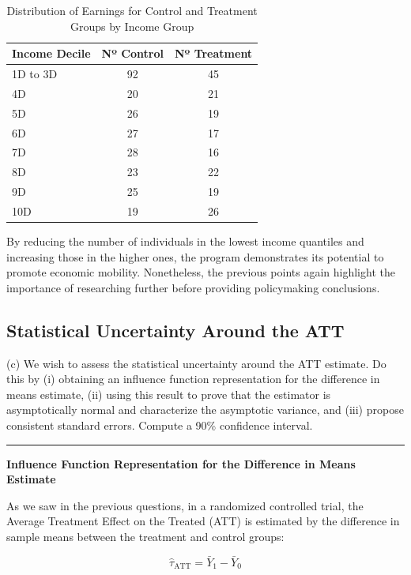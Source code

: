 \documentclass{article}
\newenvironment{colorparagraph}[1]{\par\color{#1}}{\par}
\begin{document}
\begin{table}[H]
\centering
\begin{tabular}{|l|c|c|}
\hline
\textbf{Income Decile} & \textbf{Nº Control} & \textbf{Nº Treatment} \\
\hline
1D to 3D & 92 & 45 \\
4D       & 20 & 21 \\
5D       & 26 & 19 \\
6D       & 27 & 17 \\
7D       & 28 & 16 \\
8D       & 23 & 22 \\
9D       & 25 & 19 \\
10D      & 19 & 26 \\
\hline
\end{tabular}
\caption{Distribution of Earnings for Control and Treatment Groups by Income Group}
\label{tab:earnings_distribution}
\end{table}

By reducing the number of individuals in the lowest income quantiles and increasing those in the higher ones, the program demonstrates its potential to promote economic mobility. Nonetheless, the previous points again highlight the importance of researching further before providing policymaking conclusions.

\begin{colorparagraph}{questioncolor}
\label{q4c}\subsection{Statistical Uncertainty Around the ATT}
(c) We wish to assess the statistical uncertainty around the ATT estimate. Do this by (i) obtaining an influence function representation for the difference in means estimate, (ii) using this result to prove that the estimator is asymptotically normal and characterize the asymptotic variance, and (iii) propose consistent standard errors. Compute a 90\% confidence interval.

\rule{\textwidth}{0.5pt}
\end{colorparagraph}

\textbf{Influence Function Representation for the Difference in Means Estimate}

As we saw in the previous questions, in a randomized controlled trial, the Average Treatment Effect on the Treated (ATT) is estimated by the difference in sample means between the treatment and control groups:

\[
\hat{\tau}_{\text{ATT}} = \bar{Y}_1 - \bar{Y}_0
\]
\end{document}
